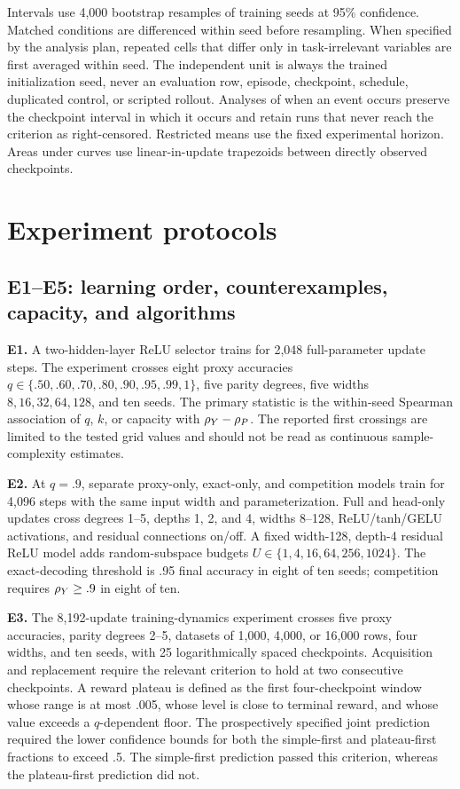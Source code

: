 Intervals use 4,000 bootstrap resamples of training seeds at 95\% confidence. Matched conditions are differenced within seed before resampling. When specified by the analysis plan, repeated cells that differ only in task-irrelevant variables are first averaged within seed. The independent unit is always the trained initialization seed, never an evaluation row, episode, checkpoint, schedule, duplicated control, or scripted rollout. Analyses of when an event occurs preserve the checkpoint interval in which it occurs and retain runs that never reach the criterion as right-censored. Restricted means use the fixed experimental horizon. Areas under curves use linear-in-update trapezoids between directly observed checkpoints.

\section{Experiment protocols}

\subsection{E1--E5: learning order, counterexamples, capacity, and algorithms}

\textbf{E1.} A two-hidden-layer ReLU selector trains for 2,048 full-parameter update steps. The experiment crosses eight proxy accuracies $q\in\{.50,.60,.70,.80,.90,.95,.99,1\}$, five parity degrees, five widths $8,16,32,64,128$, and ten seeds. The primary statistic is the within-seed Spearman association of $q$, $k$, or capacity with $\rho_Y-\rho_P$. The reported first crossings are limited to the tested grid values and should not be read as continuous sample-complexity estimates.

\textbf{E2.} At $q=.9$, separate proxy-only, exact-only, and competition models train for 4,096 steps with the same input width and parameterization. Full and head-only updates cross degrees 1--5, depths 1, 2, and 4, widths 8--128, ReLU/tanh/GELU activations, and residual connections on/off. A fixed width-128, depth-4 residual ReLU model adds random-subspace budgets $U\in\{1,4,16,64,256,1024\}$. The exact-decoding threshold is .95 final accuracy in eight of ten seeds; competition requires $\rho_Y\geq.9$ in eight of ten.

\textbf{E3.} The 8,192-update training-dynamics experiment crosses five proxy accuracies, parity degrees 2--5, datasets of 1,000, 4,000, or 16,000 rows, four widths, and ten seeds, with 25 logarithmically spaced checkpoints. Acquisition and replacement require the relevant criterion to hold at two consecutive checkpoints. A reward plateau is defined as the first four-checkpoint window whose range is at most .005, whose level is close to terminal reward, and whose value exceeds a $q$-dependent floor. The prospectively specified joint prediction required the lower confidence bounds for both the simple-first and plateau-first fractions to exceed .5. The simple-first prediction passed this criterion, whereas the plateau-first prediction did not.

